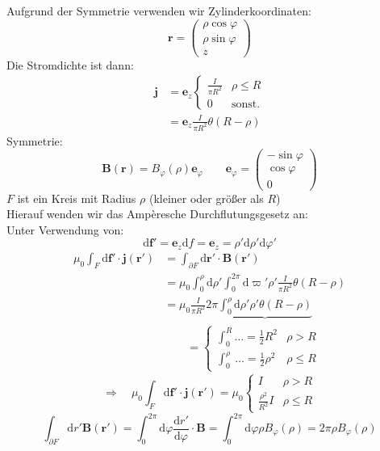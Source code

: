 \documentclass[titlepage,11pt,a4paper,ngerman]{report}
\newcommand{\tx}[1]{\textrm{#1}}
\newcommand{\ub}[1]{\underbrace{#1}}
\newcommand{\dd}{\tx{d}}
\newcommand{\casess}[4]{\left\{ \begin{array}{ll} {#1} & {#2} \\ {#3} & {#4} \end{array} \right.}
\renewcommand{\vec}[1]{\boldsymbol{#1}}
\begin{document}
%
Aufgrund der Symmetrie verwenden wir Zylinderkoordinaten:
\begin{equation*}
\vec{r} = \begin{pmatrix}
\rho \cos \varphi \\ \rho \sin \varphi \\ z
\end{pmatrix}
\end{equation*}
Die Stromdichte ist dann:
\begin{align*}
\vec{j} &= \vec{e}_z \casess{\frac{I}{\pi R^2}}{\rho \le R}{0}{\tx{sonst.}}\\
&= \vec{e}_z \frac{I}{\pi R^2} \theta(R - \rho)
\end{align*}
Symmetrie:
\begin{equation*}
\vec{B}(\vec{r}) = B_\varphi(\rho) \vec{e}_{\varphi} \qquad \vec{e}_{\varphi} = \begin{pmatrix}
- \sin \varphi \\ \cos \varphi \\ 0
\end{pmatrix}
\end{equation*}
%
%
$ F $ ist ein Kreis mit Radius $ \rho $ (kleiner oder größer als $ R $)\\
Hierauf wenden wir das Amp\`eresche Durchflutungsgesetz an:\\
Unter Verwendung von:
\begin{equation*}
\dd \vec{f}' = \vec{e}_z \dd f = \vec{e}_z = \rho' \dd \rho' \dd \varphi'
\end{equation*}
\begin{align*}
\mu_0 \int_F \dd \vec{f} ' \cdot \vec{j}(\vec{r}') &= \int_{\partial F} \dd \vec{r}' \cdot \vec{B}(\vec{r}')\\
&= \mu_0 \int_{0}^{\rho} \dd\rho' \int_{0}^{2 \pi} \dd \varpi'\rho' \frac{I}{\pi R^2} \theta(R - \rho)\\
&= \mu_0 \frac{I}{\pi R^2} 2 \pi \ub{\int_{0}^{\rho} \dd \rho' \rho' \theta(R - \rho)}\\
& \qquad = \casess{\int_{0}^{R} \dots = \frac{1}{2} R^2 }{\rho > R}{\int_{0}^{\rho}\: \dots = \frac{1}{2} \rho^2}{\rho \le R}
\end{align*}
\begin{equation*}
\Rightarrow \quad \mu_0 \int_{F} \dd \vec{f}' \cdot \vec{j}(\vec{r}') = \mu_0 \casess{I}{\rho > R}{\frac{\rho^2}{R^2} I}{\rho \le R}
\end{equation*}
\begin{equation*}
\int_{\partial F}\dd r' \vec{B}(\vec{r}') = \int_{0}^{2 \pi} \dd \varphi \frac{\dd r'}{\dd \varphi} \cdot \vec{B} = \int_{0}^{2 \pi} \dd \varphi \rho B_{\varphi}(\rho) = 2 \pi \rho B_{\varphi}(\rho)
\end{equation*}
\end{document}
